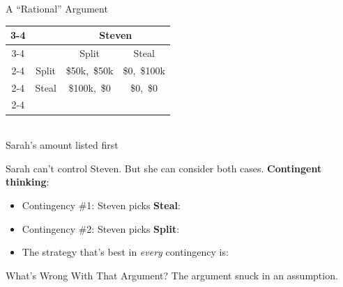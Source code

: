\begin{frame}{A ``Rational'' Argument}
\centering
{\footnotesize
\begin{tabular}{cc|c|c|}
\cline{3-4}
& & \multicolumn{2}{c|}{Steven} \\
\cline{3-4}
& & Split & Steal \\
\cline{2-4}
\multicolumn{1}{c|}{} & \multicolumn{1}{|c|}{Split} & \$50k,\ \$50k & \$0,\ \$100k \\
\cline{2-4}
\multicolumn{1}{c|}{Sarah} & \multicolumn{1}{|c|}{Steal} & \$100k,\ \$0 & \$0,\ \$0 \\
\cline{2-4}
\end{tabular}\\
\vspace{2pt}
{\scriptsize Sarah's amount listed first}}
\bsk

\raggedright
Sarah can't control Steven. But she can consider both cases. \textbf{Contingent thinking}:
\begin{itemize}
    \item Contingency \#1: Steven picks \textbf{Steal}: \vspace{0.45in}
    \item Contingency \#2: Steven picks \textbf{Split}: \vspace{0.45in}
    \item The strategy that's best in \textit{every} contingency is: \underline{\hspace{1.6in}}
\end{itemize}
\end{frame}

\begin{frame}{What's Wrong With That Argument?}
\vfill
\centering
\large
The argument snuck in an assumption.
\vfill
\normalsize
\raggedright
\vspace{1.2in}
\end{frame}

